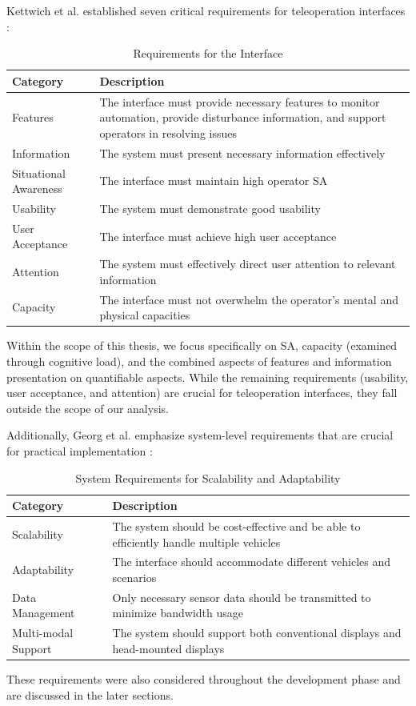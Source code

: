 Kettwich et al. established seven critical requirements for teleoperation interfaces \cite{Kettwich}:

\begin{table}[h!]
    \centering
    \begin{tabular}{@{}p{4cm}p{10cm}@{}} %
    \toprule
    \textbf{Category} & \textbf{Description} \\
    \midrule
    Features & The interface must provide necessary features to monitor automation, provide disturbance information, and support operators in resolving issues \\
    Information & The system must present necessary information effectively \\
    Situational Awareness & The interface must maintain high operator \ac{SA} \\
    Usability & The system must demonstrate good usability \\
    User Acceptance & The interface must achieve high user acceptance \\
    Attention & The system must effectively direct user attention to relevant information \\
    Capacity & The interface must not overwhelm the operator's mental and physical capacities \\
    \bottomrule
    \end{tabular}
    \caption{Requirements for the Interface}
    \label{table:interface_requirements}
    \end{table}
Within the scope of this thesis, we focus specifically on \ac{SA}, capacity (examined through cognitive load), and the combined aspects of features and information presentation on quantifiable aspects. While the remaining requirements (usability, user acceptance, and attention) are crucial for teleoperation interfaces, they fall outside the scope of our analysis.

Additionally, Georg et al. emphasize system-level requirements that are crucial for practical implementation \cite{Georg}:
\begin{table}[h!]
    \centering
    \begin{tabular}{@{}p{4cm}p{10cm}@{}}
    \toprule
    \textbf{Category} & \textbf{Description} \\
    \midrule
    Scalability & The system should be cost-effective and be able to efficiently handle multiple vehicles \\
    Adaptability & The interface should accommodate different vehicles and scenarios \\
    Data Management & Only necessary sensor data should be transmitted to minimize bandwidth usage \\
    Multi-modal Support & The system should support both conventional displays and head-mounted displays \\
    \bottomrule
    \end{tabular}
    \caption{System Requirements for Scalability and Adaptability}
    \label{table:scalability_adaptability}
    \end{table}
These requirements were also considered throughout the development phase and are discussed in the later sections.

